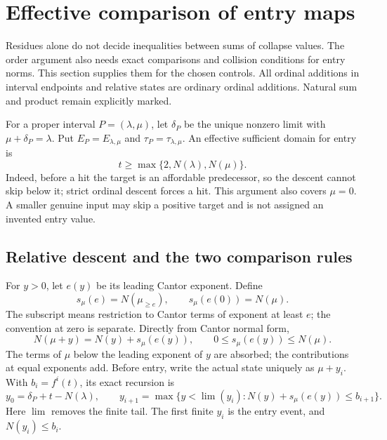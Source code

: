 \section{Effective comparison of entry maps}\label{sec:entry-comparison}

Residues alone do not decide inequalities between sums of collapse values.
The order argument also needs exact comparisons and collision conditions
for entry norms. This section supplies them for the chosen controls.
All ordinal additions in interval endpoints and relative states are ordinary
ordinal additions. Natural sum and product remain explicitly marked.

For a proper interval \(P=(\lambda,\mu)\), let \(\delta_P\) be the
unique nonzero limit with \(\mu+\delta_P=\lambda\). Put
\(E_P=E_{\lambda,\mu}\) and \(\tau_P=\tau_{\lambda,\mu}\).
An effective sufficient domain for entry is
\begin{equation}\label{eq:affordable-tail}
 t\ge\max\{2,N(\lambda),N(\mu)\}.
\end{equation}
Indeed, before a hit the target is an affordable predecessor, so the
descent cannot skip below it; strict ordinal descent forces a hit.
This argument also covers \(\mu=0\). A smaller genuine input may
skip a positive target and is not assigned an invented entry value.

\subsection{Relative descent and the two comparison rules}

For \(y>0\), let \(e(y)\) be its leading Cantor exponent. Define
\[
 s_\mu(e)=N(\mu_{\ge e}),\qquad s_\mu(e(0))=N(\mu).
\]
The subscript means restriction to Cantor terms of exponent at least
\(e\); the convention at zero is separate. Directly from Cantor
normal form,
\begin{equation}\label{eq:relative-norm}
 N(\mu+y)=N(y)+s_\mu(e(y)),\qquad 0\le s_\mu(e(y))\le N(\mu).
\end{equation}
The terms of \(\mu\) below the leading exponent of \(y\) are absorbed;
the contributions at equal exponents add. Before entry, write the actual
state uniquely as \(\mu+y_i\). With \(b_i=f^i(t)\), its exact recursion is
\begin{equation}\label{eq:relative-descent}
 y_0=\delta_P+t-N(\lambda),\qquad
 y_{i+1}=\max\{y<\operatorname{lim}(y_i):
          N(y)+s_\mu(e(y))\le b_{i+1}\}.
\end{equation}
Here \(\operatorname{lim}\) removes the finite tail. The first finite
\(y_i\) is the entry event, and \(N(y_i)\le b_i\).

